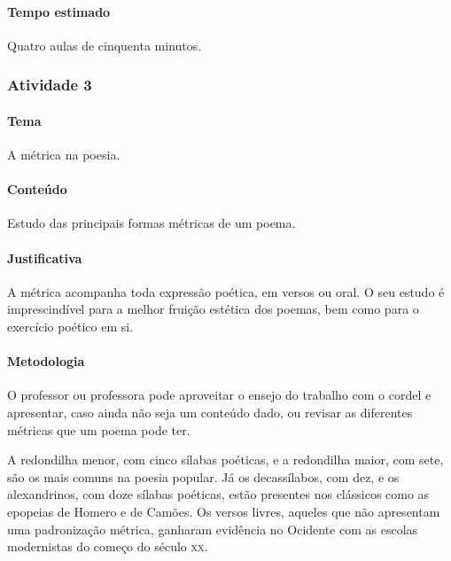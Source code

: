 \documentclass[11pt]{extarticle}
\begin{document}
\paragraph{Tempo estimado} Quatro aulas de cinquenta minutos.





\subsubsection{Atividade 3}

\paragraph{Tema} A métrica na poesia.

\paragraph{Conteúdo} Estudo das principais formas métricas de um poema.

\paragraph{Justificativa} A métrica acompanha toda expressão poética,
em versos ou oral. O seu estudo é imprescindível para a melhor fruição
estética dos poemas, bem como para o exercício poético em si.

\paragraph{Metodologia} O professor ou professora pode aproveitar o ensejo do trabalho com o cordel
e apresentar, caso ainda não seja um conteúdo dado, ou revisar as diferentes
métricas que um poema pode ter. 

A redondilha menor, com cinco sílabas poéticas, e a redondilha maior, com sete,
são os mais comuns na poesia popular. Já os decassílabos, com dez, e os alexandrinos,
com doze sílabas poéticas, estão presentes nos clássicos como as epopeias de Homero
e de Camões. Os versos livres, aqueles que não apresentam uma padronização métrica,
ganharam evidência no Ocidente com as escolas modernistas do começo do século \textsc{xx}.
\end{document}
